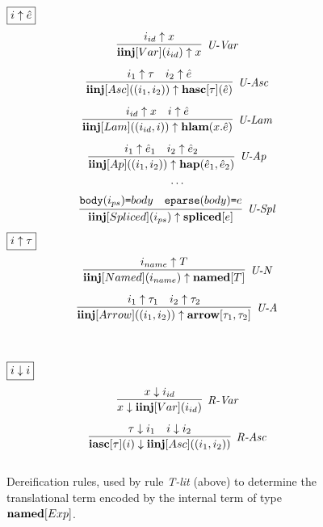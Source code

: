 \begin{figure}[t]
\centering
\begin{minipage}[t]{.48\textwidth}
$\fbox{$i \uparrow \hat{e}$}$
\vspace{-20px}
   \[
\begin{array}{c}
\infer[\textit{U-Var}]
	{ \keyw{iinj}[Var](i_{id}) \uparrow x}
	{ i_{id} \uparrow x} \\[2ex]

\infer[\textit{U-Asc}]
	{\keyw{iinj}[Asc]((i_1, i_2)) \uparrow \keyw{hasc}[\tau](\ih)}
	{i_1 \uparrow \tau & i_2 \uparrow \ih}\\[2ex]
	
\infer[\textit{U-Lam}]
	{ \keyw{iinj}[Lam]((i_{id}, i)) \uparrow \keyw{hlam}(x.\ih) }
	{ i_{id} \uparrow x & i \uparrow \ih } \\[2ex]

\infer[\textit{U-Ap}]
	{ \keyw{iinj}[Ap]((i_1, i_2)) \uparrow  \keyw{hap}(\ih_1, \ih_2)}
	{ i_1 \uparrow \ih_1 & i_2 \uparrow \ih_2  } \\[1ex]
\cdots\\[1ex]
\infer[\textit{U-Spl}]
      {\keyw{iinj}[Spliced](i_{ps}) \uparrow \keyw{spliced}[e]}
	  {\texttt{body}(i_{ps})\texttt{=}body & \texttt{eparse}(body)\texttt{=}e}
\end{array}
\]
$\fbox{$i \uparrow \tau$}$
\vspace{-15px}
\[
\begin{array}{c}
\infer[\textit{U-N}]
	{ \keyw{iinj}[Named](i_{name}) \uparrow \keyw{named}[T]}
	{ i_{name} \uparrow T} \\[2ex]

\infer[\textit{U-A}]
	{ \keyw{iinj}[Arrow]((i_1, i_2)) \uparrow \keyw{arrow}[\tau_1, \tau_2]}
	{ i_1 \uparrow \tau_1 & i_2 \uparrow \tau_2}
\end{array}
\]
\caption{Dereification rules, used by rule \textit{T-lit} (above) to determine the translational term encoded by the internal term of type $\textbf{named}[Exp]$.}
\label{fig:dereification}
\end{minipage}%
~\vline\,
\begin{minipage}[t]{.44\textwidth}
$\fbox{$i \downarrow i$}$
\vspace{-20px}
  \[
\begin{array}{c}
\infer[\textit{R-Var}]
	{x \downarrow \keyw{iinj}[Var](i_{id})}
	{x \downarrow i_{id}} \\[2ex]

\infer[\textit{R-Asc}]
	{\keyw{iasc}[\tau](i) \downarrow \keyw{iinj}[Asc]((i_1, i_2))}
	{\tau \downarrow i_1 & i \downarrow i_2}\\[2ex]
	

\end{array}\]
\end{minipage}
\end{figure}
